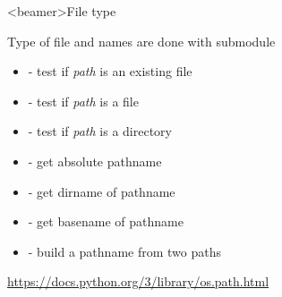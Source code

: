 \begin{frame}<beamer>{File type}

  Type of file and names are done with  submodule

  \begin{itemize}
    \item<2->  - test if \textit{path} is an existing file
    \item<3->  - test if \textit{path} is a file
    \item<4->  - test if \textit{path} is a directory
    \item<5->  - get absolute pathname
    \item<6->  - get dirname of pathname
    \item<7->  - get basename of pathname
    \item<8->  - build a pathname from two paths
  \end{itemize}

  \medskip

  \begin{center}
     \url{https://docs.python.org/3/library/os.path.html}
  \end{center}

\end{frame}


